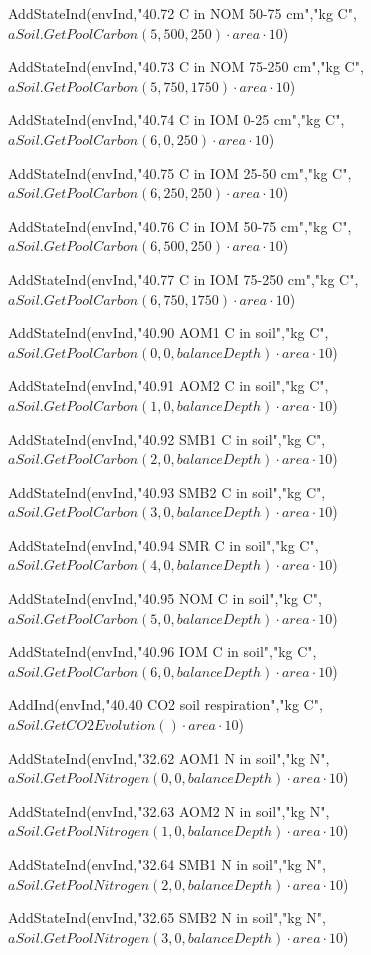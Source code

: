 \documentclass[%
]{scrartcl}
\begin{document}
{{{AddStateInd(envInd,"40.72 C in NOM 50-75 cm","kg C",
$aSoil.GetPoolCarbon(5,500,250) \cdot area \cdot 10$)
		
AddStateInd(envInd,"40.73 C in NOM 75-250 cm","kg C",
$aSoil.GetPoolCarbon(5,750,1750) \cdot area \cdot 10$)
		
AddStateInd(envInd,"40.74 C in IOM 0-25 cm","kg C",
$aSoil.GetPoolCarbon(6,0,250) \cdot area \cdot 10$)
		 
AddStateInd(envInd,"40.75 C in IOM 25-50 cm","kg C",
$aSoil.GetPoolCarbon(6,250,250) \cdot area \cdot 10$)
		 
AddStateInd(envInd,"40.76 C in IOM 50-75 cm","kg C",
$aSoil.GetPoolCarbon(6,500,250) \cdot area \cdot 10$)
		 
AddStateInd(envInd,"40.77 C in IOM 75-250 cm","kg C",
$aSoil.GetPoolCarbon(6,750,1750) \cdot area \cdot 10$)

 AddStateInd(envInd,"40.90 AOM1 C in soil","kg C",
$aSoil.GetPoolCarbon(0,0,balanceDepth) \cdot area \cdot 10$)
 
 AddStateInd(envInd,"40.91 AOM2 C in soil","kg C",
$aSoil.GetPoolCarbon(1,0,balanceDepth) \cdot area \cdot 10$)
  
AddStateInd(envInd,"40.92 SMB1 C in soil","kg C",
$aSoil.GetPoolCarbon(2,0,balanceDepth) \cdot area \cdot 10$)
 
 AddStateInd(envInd,"40.93 SMB2 C in soil","kg C",
$aSoil.GetPoolCarbon(3,0,balanceDepth) \cdot area \cdot 10$)
   
AddStateInd(envInd,"40.94 SMR C in soil","kg C",
$aSoil.GetPoolCarbon(4,0,balanceDepth) \cdot area \cdot 10$)
  
AddStateInd(envInd,"40.95 NOM C in soil","kg C",
$aSoil.GetPoolCarbon(5,0,balanceDepth) \cdot area \cdot 10$)
   
AddStateInd(envInd,"40.96 IOM C in soil","kg C",
$aSoil.GetPoolCarbon(6,0,balanceDepth) \cdot area \cdot 10$)

 
  AddInd(envInd,"40.40 CO2 soil respiration","kg C",
$aSoil.GetCO2Evolution() \cdot area \cdot 10$)

  AddStateInd(envInd,"32.62 AOM1 N in soil","kg N",
$aSoil.GetPoolNitrogen(0,0,balanceDepth) \cdot area \cdot 10$)
   
  AddStateInd(envInd,"32.63 AOM2 N in soil","kg N",
$aSoil.GetPoolNitrogen(1,0,balanceDepth) \cdot area \cdot 10$)
  
  AddStateInd(envInd,"32.64 SMB1 N in soil","kg N",
$aSoil.GetPoolNitrogen(2,0,balanceDepth) \cdot area \cdot 10$)
   
  AddStateInd(envInd,"32.65 SMB2 N in soil","kg N",
$aSoil.GetPoolNitrogen(3,0,balanceDepth) \cdot area \cdot 10$)
   
}}}
\end{document}
